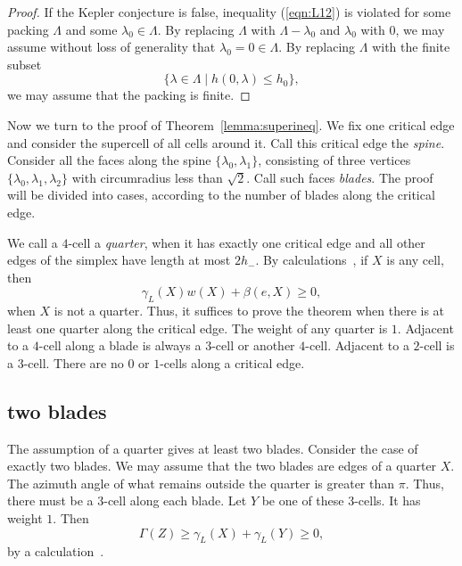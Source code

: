 \begin{proof} If the Kepler conjecture is false, inequality (\ref{eqn:L12}) is violated for some packing $\Lambda$ and some $\lambda_0\in\Lambda$.  By replacing $\Lambda$ with $\Lambda - \lambda_0$ and $\lambda_0$ with $0$, we may assume without loss of generality that $\lambda_0=0\in\Lambda$.  By replacing $\Lambda$ with the finite subset
$$
\{\lambda\in\Lambda\mid h(0,\lambda)\le h_0\},
$$
we may assume that the packing is finite.
\end{proof}


Now we turn to the proof of Theorem~\ref{lemma:superineq}. We fix one critical edge and consider the supercell of all cells around it.  Call this critical edge the {\it spine}.  Consider all the faces along the spine $\{\lambda_0,\lambda_1\}$, consisting of three vertices $\{\lambda_0,\lambda_1,\lambda_2\}$ with circumradius less than $\sqrt2$.  Call such faces {\it blades}.  The proof will be divided into cases, according to the number of blades along the critical edge.

We call a $4$-cell a {\it quarter}, when it has exactly one critical edge and all other edges of the simplex have length at most $2 h_-$. By calculations~\cite[cc:qtr:GLFVCVK]{hales:2009:nonlinear}, if $X$ is any cell, then %
$$
 \gamma_L(X) w(X) + \beta(e,X)\ge 0,
$$ 
when $X$ is not a quarter.  Thus, it
suffices to prove the theorem
when there is at least one quarter along the critical
edge.  The weight of any quarter is $1$.
Adjacent to a $4$-cell along a blade is always a $3$-cell or another $4$-cell. Adjacent to a $2$-cell is a $3$-cell.  There are no $0$ or $1$-cells along a critical edge.



\subsection{two blades}

The assumption of a quarter gives at least two blades.  Consider
the case of exactly two blades.
We may assume that the two blades are edges of a quarter
$X$. 
The azimuth angle of what remains outside the quarter
is greater than $\pi$.  Thus, there must be a $3$-cell
along each blade.  Let $Y$ be one of these $3$-cells.
It has weight $1$.
Then 
\begin{equation}\label{eqn:34}
\Gamma(Z)\ge \gamma_L(X)+\gamma_L(Y)\ge 0,
\end{equation}
by a calculation~\cite[cc:2bl:FHBVYXZ]{hales:2009:nonlinear}. %

